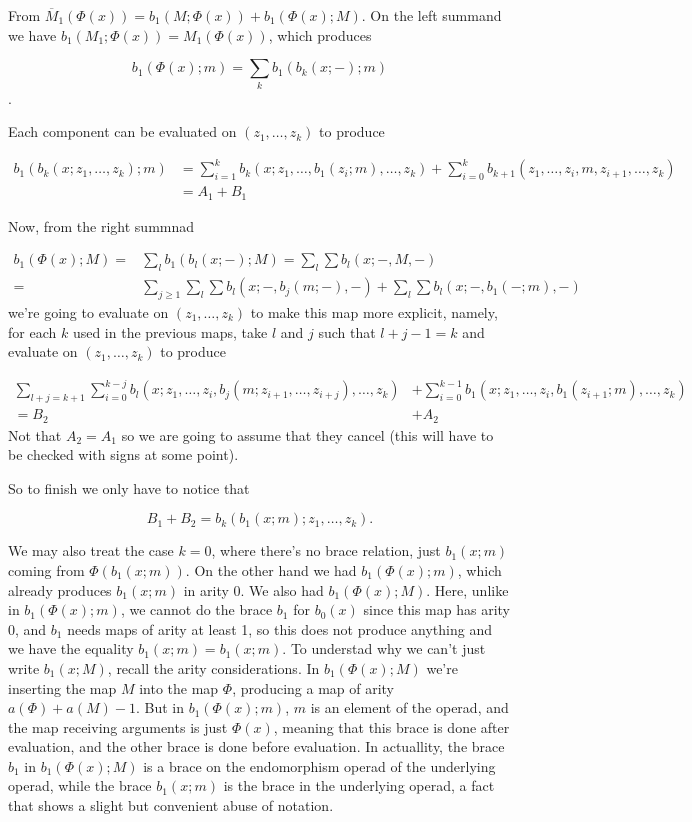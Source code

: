 \documentclass[twoside]{article}
\begin{document}
From $\overline{M}_1(\Phi(x))=b_1(M;\Phi(x))+b_1(\Phi(x);M)$.  On the left summand we have $b_1(M_1;\Phi(x))=M_1(\Phi(x))$, which produces 

$$b_1(\Phi(x);m)=\sum_k b_1(b_k(x;-);m)$$. 

Each component can be evaluated on $(z_1,\dots, z_k)$ to produce

\begin{align*}
b_1(b_k(x;z_1, \dots, z_k);m)&=\sum_{i=1}^k b_k(x;z_1,\dots, b_1(z_i;m),\dots, z_k)+\sum_{i=0}^k b_{k+1}(z_1,\dots, z_i,m,z_{i+1},\dots, z_k)\\
&=A_1+B_1
\end{align*}

Now, from the right summnad 

\begin{align*}
b_1(\Phi(x);M)=&\sum_l b_1(b_l(x;-);M)=\sum_l\sum b_l(x;-,M,-) \\
=&\sum_{j\geq 1} \sum_l\sum b_l(x;-,b_j(m;-),-)+\sum_l\sum b_l(x;-,b_1(-;m),-)
\end{align*}
 we're going to evaluate on $(z_1,\dots, z_k)$ to make this map more explicit, namely, for each $k$ used in the previous maps, take $l$ and $j$ such that $l+j-1=k$ and evaluate on $(z_1,\dots, z_k)$ to produce
 
 \begin{align*}
 \sum_{l+j=k+1}\sum_{i=0}^{k-j} b_l(x;z_1,\dots, z_i,b_j(m;z_{i+1},\dots, z_{i+j}),\dots, z_k)&+\sum_{i=0}^{k-1} b_1(x;z_1,\dots, z_i,b_1(z_{i+1};m),\dots, z_k)\\
 =B_2&+A_2
 \end{align*}
 Not that $A_2=A_1$ so we are going to assume that they cancel (this will have to be checked with signs at some point).
 
 So to finish we only have to notice that 
 
 $$B_1+B_2=b_k(b_1(x;m);z_1,\dots, z_k).$$
 
 
 We may also treat the case $k=0$, where there's no brace relation, just $b_1(x;m)$ coming from $\Phi(b_1(x;m))$. On the other hand we had $b_1(\Phi(x);m)$, which already produces $b_1(x;m)$ in arity 0. We also had $b_1(\Phi(x);M)$. Here, unlike in $b_1(\Phi(x);m)$, we cannot do the brace $b_1$ for $b_0(x)$ since this map has arity 0, and $b_1$ needs maps of arity at least 1, so this does not produce anything and we have the equality $b_1(x;m)=b_1(x;m)$. To understad why we can't just write $b_1(x;M)$, recall the arity considerations. In $b_1(\Phi(x);M)$ we're inserting the map $M$ into the map $\Phi$, producing a map of arity $a(\Phi)+a(M)-1$. But in $b_1(\Phi(x);m)$, $m$ is an element of the operad, and the map receiving arguments is just $\Phi(x)$, meaning that this brace is done after evaluation, and the other brace is done before evaluation. In actuallity, the brace $b_1$ in $b_1(\Phi(x);M)$ is a brace on the endomorphism operad of the underlying operad, while the brace $b_1(x;m)$ is the brace in the underlying operad, a fact that shows a slight but convenient abuse of notation.
\end{document}
